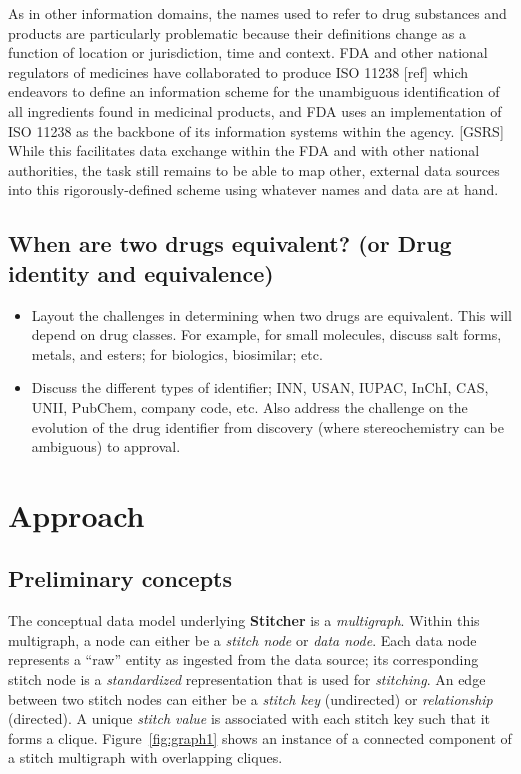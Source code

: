 \documentclass{bioinfo}
\newcommand\st{\textbf{Stitcher}}
\begin{document}
As in other information domains, the names used to refer to drug substances and products are particularly problematic because their definitions change as a function of location or jurisdiction, time and context. FDA and other national regulators of medicines have collaborated to produce ISO 11238 [ref] which endeavors to define an information scheme for the unambiguous identification of all ingredients found in medicinal products, and FDA uses an implementation of ISO 11238 as the backbone of its information systems within the agency. [GSRS] While this facilitates data exchange within the FDA and with other national authorities, the task still remains to be able to map other, external data sources into this rigorously-defined scheme using whatever names and data are at hand.

\subsection{When are two drugs equivalent? (or Drug identity and equivalence)}
\begin{itemize}
\item Layout the challenges in determining when two drugs are equivalent. This will depend on drug classes. For example, for small molecules, discuss salt forms, metals, and esters; for biologics, biosimilar; etc.
\item Discuss the different types of identifier; INN, USAN, IUPAC, InChI, CAS, UNII, PubChem, company code, etc. Also address the challenge on the evolution of the drug identifier from discovery (where stereochemistry can be ambiguous) to approval.
\end{itemize}


\section{Approach}

\subsection{Preliminary concepts}
The conceptual data model underlying \st{} is a \emph{multigraph}. Within this multigraph, a node can either be a \emph{stitch node} or \emph{data node}. Each data node represents a ``raw'' entity as ingested from the data source; its corresponding stitch node is a \emph{standardized} representation that is used for \emph{stitching}. An edge between two stitch nodes can either be a \emph{stitch key} (undirected) or \emph{relationship} (directed). A unique \emph{stitch value} is associated with each stitch key such that it forms a clique. Figure~\ref{fig:graph1} shows an instance of a connected component of a stitch multigraph with overlapping cliques.
\end{document}
